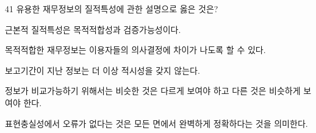 \begin{question}{41}
유용한 재무정보의 질적특성에 관한 설명으로 옳은 것은?
\begin{choices}
  \item 근본적 질적특성은 목적적합성과 검증가능성이다.
  \item 목적적합한 재무정보는 이용자들의 의사결정에 차이가 나도록 할 수 있다.
  \item 보고기간이 지난 정보는 더 이상 적시성을 갖지 않는다.
  \item 정보가 비교가능하기 위해서는 비슷한 것은 다르게 보여야 하고 다른 것은 비슷하게 보여야 한다.
  \item 표현충실성에서 오류가 없다는 것은 모든 면에서 완벽하게 정확하다는 것을 의미한다.
\end{choices}
\end{question}
